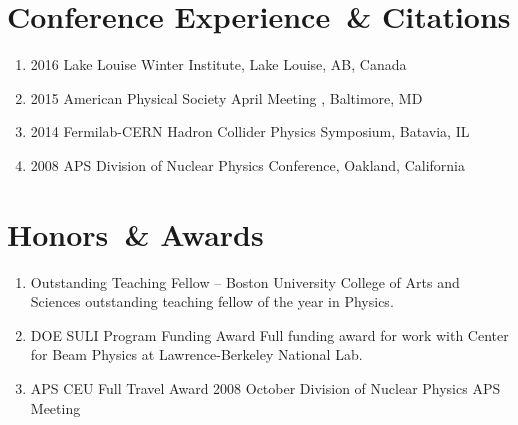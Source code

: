 
\section*{Conference Experience~\& Citations}



\begin{enumerate}
 0cm \linewidth \listindent \dimexpr\linewidth-\listindent\relax

\item[] 2016 Lake Louise Winter Institute, Lake Louise, AB, Canada 
\item[] 2015 American Physical Society April Meeting , Baltimore, MD
\item[] 2014 Fermilab-CERN Hadron Collider Physics Symposium, Batavia, IL
\item[] 2008 APS Division of Nuclear Physics Conference, Oakland, California 
\end{enumerate}


\section*{Honors~\& Awards}


\begin{enumerate}
 0cm \linewidth \listindent \dimexpr\linewidth-\listindent\relax
\item[] Outstanding Teaching Fellow \hfill {} --  \newline
Boston University College of Arts and Sciences outstanding teaching fellow of the year in Physics.


\item[] DOE SULI Program Funding Award \hfill {}\newline
{Full funding award for work with Center for Beam Physics at Lawrence-Berkeley National Lab.
}


\item[] APS CEU Full Travel Award \hfill {} \newline
{2008 October Division of Nuclear Physics APS Meeting}


\end{enumerate}

